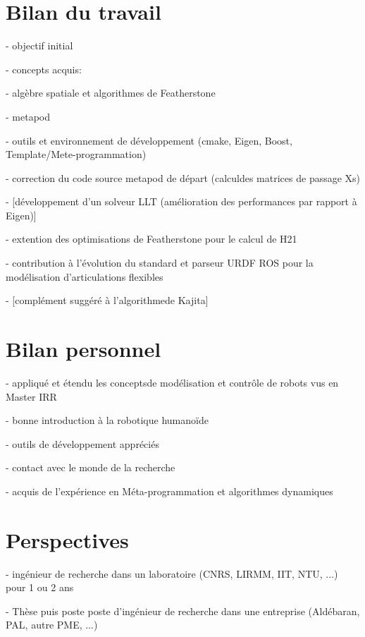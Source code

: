 \documentclass{report}
\begin{document}
\section*{Bilan du travail}

- objectif initial

- concepts acquis:

	- algèbre spatiale et algorithmes de Featherstone
	
	- metapod
	
	- outils et environnement de développement (cmake, Eigen, Boost, Template/Mete-programmation)

- correction du code source metapod de départ (calculdes matrices de passage Xs)

- [développement d'un solveur LLT (amélioration des performances par rapport à Eigen)]

- extention des optimisations de Featherstone pour le calcul de H21

- contribution à l'évolution du standard et parseur URDF ROS pour la modélisation d'articulations flexibles

- [complément suggéré à l'algorithmede Kajita]


\section*{Bilan personnel}

- appliqué et étendu les conceptsde modélisation et contrôle de robots vus en Master IRR

- bonne introduction à la robotique humanoïde

- outils de développement appréciés

- contact avec le monde de la recherche

- acquis de l'expérience en Méta-programmation et algorithmes dynamiques


\section*{Perspectives}

- ingénieur de recherche dans un laboratoire (CNRS, LIRMM, IIT, NTU, ...) pour 1 ou 2 ans

- Thèse puis poste poste d'ingénieur de recherche dans une entreprise (Aldébaran, PAL, autre PME, ...)



\appendix




\clearpage
{}

\end{document}
